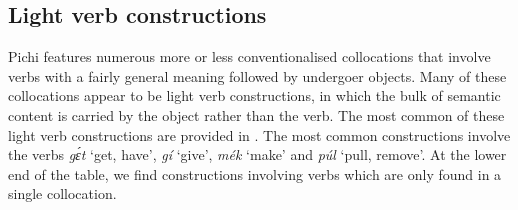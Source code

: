 \subsection{Light verb constructions}\label{sec:9.3.1}

Pichi features numerous more or less conventionalised collocations that involve verbs with a fairly general meaning followed by undergoer objects. Many of these collocations appear to be light verb constructions, in which the bulk of semantic content is carried by the object rather than the verb. The most common of these light verb constructions are provided in . The most common constructions involve the verbs \textit{gɛ́t} ‘get, have’, \textit{gí} ‘give’, \textit{mék} ‘make’ and \textit{púl} ‘pull, remove’. At the lower end of the table, we find constructions involving verbs which are only found in a single collocation. 

